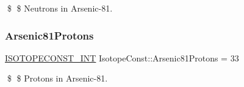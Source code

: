 \$ \$ Neutrons in Arsenic-\/81. \mbox{\label{group___isotope_const-_arsenic-_as81_ga564e95702e7b393dcaacde8fae7410c4}} 
\subsubsection{\texorpdfstring{Arsenic81\+Protons}{Arsenic81Protons}}
{\footnotesize\ttfamily \mbox{\hyperlink{group___isotope_const-_macros_ga5f18360b3e99483a35c32d789e62621c}{I\+S\+O\+T\+O\+P\+E\+C\+O\+N\+S\+T\+\_\+\+I\+NT}} Isotope\+Const\+::\+Arsenic81\+Protons = 33}

\$ \$ Protons in Arsenic-\/81. 